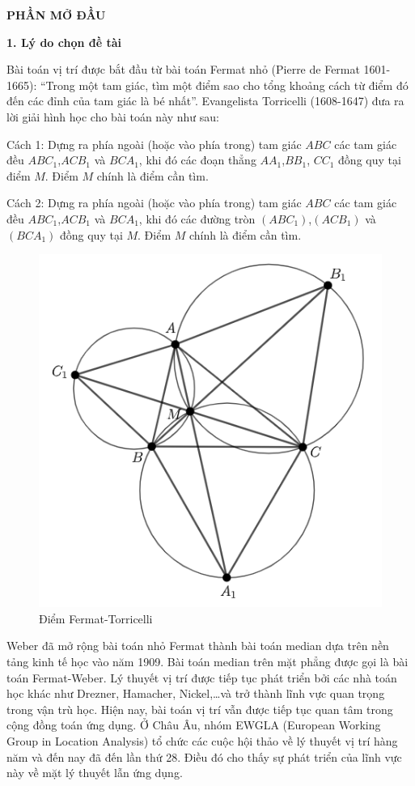 \documentclass[12pt,oneside,a4paper]{bookAnh1}
\theoremstyle{plain}
\theoremstyle{nonumberplain}
\numberwithin{equation}{chapter}
\begin{document}
{\centerline{\bf\fontsize{14pt}{120}\selectfont PHẦN MỞ ĐẦU}

\noindent\textbf{1. Lý do chọn đề tài}

Bài toán vị trí được bắt đầu từ bài toán Fermat nhỏ (Pierre de Fermat 1601-1665): “Trong một tam giác, tìm một điểm sao cho tổng khoảng cách từ điểm đó đến các đỉnh của tam giác là bé nhất”.  Evangelista Torricelli (1608-1647) đưa ra lời giải hình học cho bài toán này như sau:
    
Cách 1: Dựng ra phía ngoài (hoặc vào phía trong) tam giác $ABC$ các tam giác đều $ABC_1$,$ACB_1$ và $BCA_1$, khi đó các đoạn thẳng $AA_1$,$BB_1$, $CC_1$ đồng quy tại điểm $M$. Điểm $M$ chính là điểm cần tìm.

 Cách 2: Dựng ra phía ngoài (hoặc vào phía trong) tam giác $ABC$ các tam giác đều $ABC_1$,$ACB_1$ và $BCA_1$, khi đó các đường tròn $(ABC_1)$,$(ACB_1)$ và $(BCA_1)$ đồng quy tại $M$. Điểm $M$ chính là điểm cần tìm.
\begin{figure}[hpt!] 
    \centering 
    \includegraphics{FF11.png} 
    \caption{Điểm Fermat-Torricelli}
    \label{fig0}
\end{figure}

Weber đã mở rộng bài toán nhỏ Fermat thành bài toán median dựa trên nền tảng kinh tế học vào năm 1909. Bài toán median trên mặt phẳng được gọi là bài toán Fermat-Weber. Lý thuyết vị trí được tiếp tục phát triển bởi các nhà toán học khác như Drezner, Hamacher, Nickel,…và trở thành lĩnh vực quan trọng trong vận trù học. Hiện nay, bài toán vị trí vẫn được tiếp tục quan tâm trong cộng đồng toán ứng dụng. Ở Châu Âu, nhóm EWGLA (European Working Group in Location Analysis) tổ chức các cuộc hội thảo về lý thuyết vị trí hàng năm và đến nay đã đến lần thứ 28. Điều đó cho thấy sự phát triển của lĩnh vực này về mặt lý thuyết lẫn ứng dụng. 

}
\end{document}
